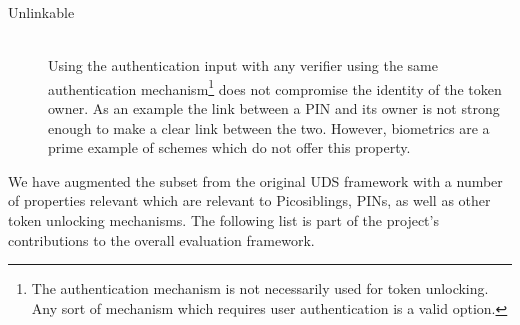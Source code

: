 \begin{description}
  \item[Unlinkable] \hfill \\
  Using the authentication input with any verifier using the same authentication mechanism\footnote{The authentication mechanism is not necessarily used for token unlocking. Any sort of mechanism which requires user authentication is a valid option.} does not compromise the identity of the token owner. As an example the link between a PIN and its owner is not strong enough to make a clear link between the two. However, biometrics are a prime example of schemes which do not offer this property.
  
\end{description}

We have augmented the subset from the original UDS framework with a number of properties relevant which are relevant to Picosiblings, PINs, as well as other token unlocking mechanisms. The following list is part of the project's contributions to the overall evaluation framework.


